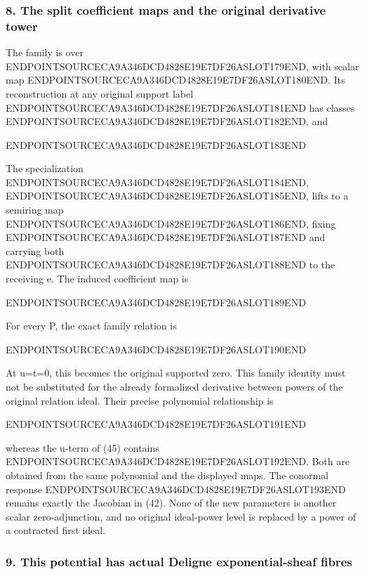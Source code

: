 \subsubsection{8. The split coefficient maps and the original derivative tower}\label{endpoint-exponential_original--the-split-coefficient-maps-and-the-original-derivative-tower}

The family is over ENDPOINTSOURCECA9A346DCD4828E19E7DF26ASLOT179END, with scalar map ENDPOINTSOURCECA9A346DCD4828E19E7DF26ASLOT180END. Its reconstruction at any original support label ENDPOINTSOURCECA9A346DCD4828E19E7DF26ASLOT181END has classes ENDPOINTSOURCECA9A346DCD4828E19E7DF26ASLOT182END, and

ENDPOINTSOURCECA9A346DCD4828E19E7DF26ASLOT183END

The specialization ENDPOINTSOURCECA9A346DCD4828E19E7DF26ASLOT184END, ENDPOINTSOURCECA9A346DCD4828E19E7DF26ASLOT185END, lifts to a semiring map ENDPOINTSOURCECA9A346DCD4828E19E7DF26ASLOT186END, fixing ENDPOINTSOURCECA9A346DCD4828E19E7DF26ASLOT187END and carrying both ENDPOINTSOURCECA9A346DCD4828E19E7DF26ASLOT188END to the receiving e. The induced coefficient map is

ENDPOINTSOURCECA9A346DCD4828E19E7DF26ASLOT189END

For every P, the exact family relation is

ENDPOINTSOURCECA9A346DCD4828E19E7DF26ASLOT190END

At u=t=0, this becomes the original supported zero. This family identity must not be substituted for the already formalized derivative between powers of the original relation ideal. Their precise polynomial relationship is

ENDPOINTSOURCECA9A346DCD4828E19E7DF26ASLOT191END

whereas the u-term of (45) contains ENDPOINTSOURCECA9A346DCD4828E19E7DF26ASLOT192END. Both are obtained from the same polynomial and the displayed maps. The conormal response ENDPOINTSOURCECA9A346DCD4828E19E7DF26ASLOT193END remains exactly the Jacobian in (42). None of the new parameters is another scalar zero-adjunction, and no original ideal-power level is replaced by a power of a contracted first ideal.

\subsubsection{9. This potential has actual Deligne exponential-sheaf fibres}\label{endpoint-exponential_original--this-potential-has-actual-deligne-exponential-sheaf-fibres}

